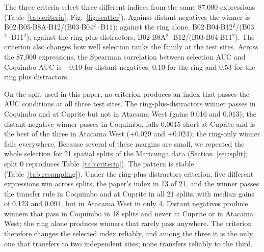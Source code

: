 \documentclass[preprint,authoryear,number]{elsarticle}
\begin{document}
The three criteria select three different indices from the same 87{,}000 expressions (Table~\ref{tab:criteria}, Fig.~\ref{fig:scatter}). Against distant negatives the winner is B02$\cdot$B05$\cdot$B8A$\cdot$B12/(B03$\cdot$B04$^2\cdot$B11); against the ring alone, B02$\cdot$B04$\cdot$B12$^2$/(B03$^2\cdot$B11$^2$); against the ring plus distractors, B02$\cdot$B8A$^2\cdot$B12/(B03$\cdot$B04$\cdot$B11$^2$). The criterion also changes how well selection ranks the family at the test sites. Across the 87{,}000 expressions, the Spearman correlation between selection AUC and Coquimbo AUC is $-0.10$ for distant negatives, $0.10$ for the ring and $0.53$ for the ring plus distractors.

On the split used in this paper, no criterion produces an index that passes the AUC conditions at all three test sites. The ring-plus-distractors winner passes in Coquimbo and at Cuprite but not in Atacama West (gains 0.016 and 0.013); the distant-negative winner passes in Coquimbo, falls 0.0015 short at Cuprite and is the best of the three in Atacama West (+0.029 and +0.024); the ring-only winner fails everywhere. Because several of these margins are small, we repeated the whole selection for 21 spatial splits of the Maricunga data (Section~\ref{sec:split}; split 0 reproduces Table~\ref{tab:criteria}). The pattern is stable (Table~\ref{tab:resampling}). Under the ring-plus-distractors criterion, five different expressions win across splits, the paper's index in 13 of 21, and the winner passes the transfer rule in Coquimbo and at Cuprite in all 21 splits, with median gains of 0.123 and 0.094, but in Atacama West in only 4. Distant negatives produce winners that pass in Coquimbo in 18 splits and never at Cuprite or in Atacama West; the ring alone produces winners that rarely pass anywhere. The criterion therefore changes the selected index reliably, and among the three it is the only one that transfers to two independent sites; none transfers reliably to the third.
\end{document}
